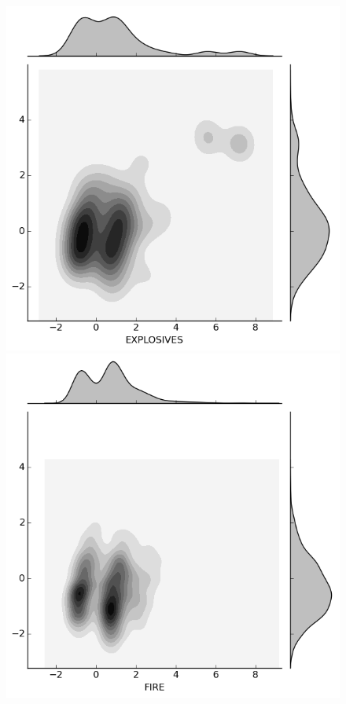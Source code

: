 \begin{figure}[H]
  \begin{minipage}[b]{0.20\linewidth}
    \includegraphics[width=\linewidth]{images/weapon/EXPLOSIVES.png}
  \end{minipage}
  \quad
  \begin{minipage}[b]{0.20\linewidth}
    \includegraphics[width=\linewidth]{images/weapon/FIRE.png}

\end{minipage}
\end{figure}
